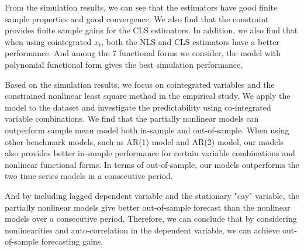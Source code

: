 \documentclass[a4paper,12pt,times,numbered,print,index]{report}
\numberwithin{equation}{section}
\begin{document}
From the simulation results, we can see that the estimators have good finite sample properties and good convergence. We also find that the constraint provides finite sample gains for the CLS estimators. In addition, we also find that when using cointegrated $x_t$, both the NLS and CLS estimators have a better performance. And among the 7 functional forms we consider, the model with polynomial functional form  gives the best simulation performance. 

Based on the simulation results, we focus on cointegrated variables and the constrained nonlinear least square method in the empirical study. We apply the model to the \cite{welch2008comprehensive} dataset and investigate the predictability using co-integrated variable combinations. We find that the partially nonlinear models can outperform sample mean model both in-sample and out-of-sample. When using other benchmark models, such as AR(1) model and AR(2) model, our models also provides better in-sample performance for certain variable combinations and nonlinear functional forms. In terms of out-of-sample, our models outperforms the two time series models in a consecutive period. 

And by including lagged dependent variable and the stationary "cay" variable, the partially nonlinear models give better out-of-sample forecast than the nonlinear models over a consecutive period. Therefore, we can conclude that by considering nonlinearities and auto-correlation in the dependent variable, we can achieve out-of-sample forecasting gains.
\end{document}
